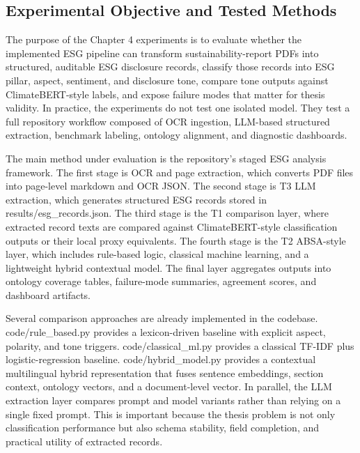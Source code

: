 \documentclass[english, online, cse, master]{dithesis}
\begin{document}
\subsection{Experimental Objective and Tested Methods}

The purpose of the Chapter 4 experiments is to evaluate whether the implemented ESG pipeline can transform sustainability-report PDFs into structured, auditable ESG disclosure records, classify those records into ESG pillar, aspect, sentiment, and disclosure tone, compare tone outputs against ClimateBERT-style labels, and expose failure modes that matter for thesis validity. In practice, the experiments do not test one isolated model. They test a full repository workflow composed of OCR ingestion, LLM-based structured extraction, benchmark labeling, ontology alignment, and diagnostic dashboards.

The main method under evaluation is the repository’s staged ESG analysis framework. The first stage is OCR and page extraction, which converts PDF files into page-level markdown and OCR JSON. The second stage is T3 LLM extraction, which generates structured ESG records stored in results/esg\_records.json. The third stage is the T1 comparison layer, where extracted record texts are compared against ClimateBERT-style classification outputs or their local proxy equivalents. The fourth stage is the T2 ABSA-style layer, which includes rule-based logic, classical machine learning, and a lightweight hybrid contextual model. The final layer aggregates outputs into ontology coverage tables, failure-mode summaries, agreement scores, and dashboard artifacts.

Several comparison approaches are already implemented in the codebase. code/rule\_based.py provides a lexicon-driven baseline with explicit aspect, polarity, and tone triggers. code/classical\_ml.py provides a classical TF-IDF plus logistic-regression baseline. code/hybrid\_model.py provides a contextual multilingual hybrid representation that fuses sentence embeddings, section context, ontology vectors, and a document-level vector. In parallel, the LLM extraction layer compares prompt and model variants rather than relying on a single fixed prompt. This is important because the thesis problem is not only classification performance but also schema stability, field completion, and practical utility of extracted records.
\end{document}
